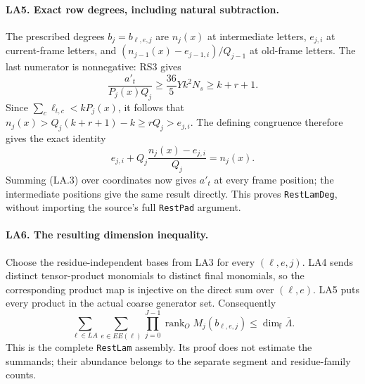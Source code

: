 \paragraph{LA5. Exact row degrees, including natural subtraction.}
The prescribed degrees $b_j=b_{\ell,e,j}$ are $n_j(x)$ at intermediate letters, $e_{j,i}$ at current-frame letters, and
$(n_{j-1}(x)-e_{j-1,i})/Q_{j-1}$ at old-frame letters.
The last numerator is nonnegative: RS3 gives
\[
 \frac{a'_t}{P_j(x)Q_j}\ge\frac{36}{5}Yk^2N_s\ge k+r+1.
\]
Since $\sum_c\ell_{t,c}<kP_j(x)$, it follows that
$n_j(x)>Q_j(k+r+1)-k\ge rQ_j>e_{j,i}$.
The defining congruence therefore gives the exact identity
\[
 e_{j,i}+Q_j\frac{n_j(x)-e_{j,i}}{Q_j}=n_j(x).
\]
Summing (LA.3) over coordinates now gives $a'_t$ at every frame position; the intermediate positions give the same result directly.
This proves \texttt{RestLamDeg}, without importing the source's full \texttt{RestPad} argument.

\paragraph{LA6. The resulting dimension inequality.}
Choose the residue-independent bases from LA3 for every $(\ell,e,j)$.
LA4 sends distinct tensor-product monomials to distinct final monomials, so the corresponding product map is injective on the direct sum over $(\ell,e)$.
LA5 puts every product in the actual coarse generator set.
Consequently
\[
 \boxed{\displaystyle
 \sum_{\ell\in LA}\sum_{e\in EE(\ell)}
 \prod_{j=0}^{J-1}\operatorname{rank}_O M_j(b_{\ell,e,j})
 \le\dim_{\mathbb f}\overline\Lambda.} \tag{LA.4}
\]
This is the complete \texttt{RestLam} assembly. Its proof does not estimate the summands; their abundance belongs to the separate segment and residue-family counts.
